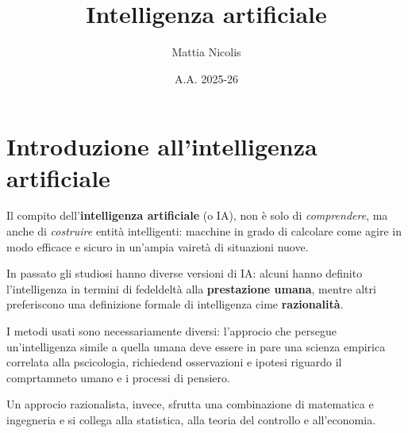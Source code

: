 \documentclass[a4paper, 12pt]{book}
\title{\textbf{Intelligenza artificiale}}
\author{Mattia Nicolis}
\date{A.A. 2025-26}
\begin{document}
    \maketitle

    \tableofcontents
    \markboth{}{}

    \chapter*{Introduzione all'intelligenza artificiale}
    Il compito dell'\textbf{intelligenza artificiale} (o IA), non è solo di \textit{comprendere}, ma anche di \textit{costruire} entità intelligenti: macchine in grado di calcolare come agire in modo efficace e sicuro in un'ampia vairetà di situazioni nuove.

    In passato gli studiosi hanno diverse versioni di IA: alcuni hanno definito l'intelligenza in termini di fedeldeltà alla \textbf{prestazione umana}, mentre altri preferiscono una definizione formale di intelligenza cime \textbf{razionalità}.

    I metodi usati sono necessariamente diversi: l'approcio che persegue un'intelligenza simile a quella umana deve essere in pare una scienza empirica correlata alla pscicologia, richiedend osservazioni e ipotesi riguardo il comprtamneto umano e i processi di pensiero.

    Un approcio razionalista, invece, sfrutta una combinazione di matematica e ingegneria e si collega alla statistica, alla teoria del controllo e all'economia.
\end{document}

